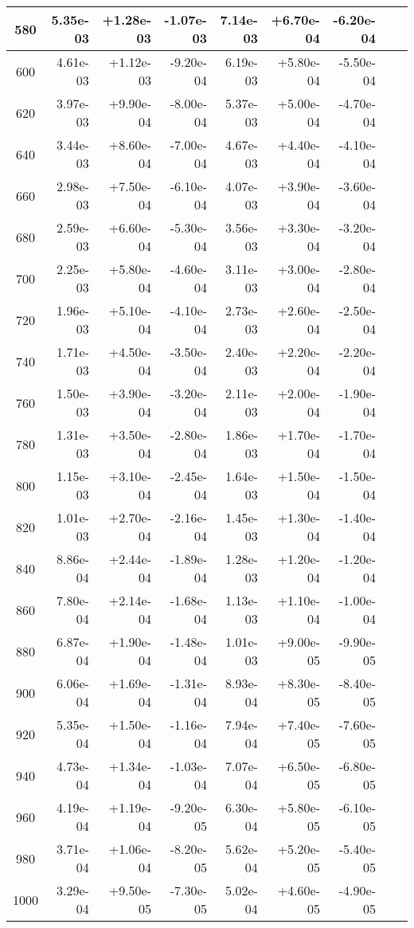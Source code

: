 \begin{tabular}{|c|r|r|r|r|r|r|r|r|}
\hline 580 & 5.35e-03 & +1.28e-03 & -1.07e-03 & 7.14e-03 & +6.70e-04 & -6.20e-04 \\
\hline 600 & 4.61e-03 & +1.12e-03 & -9.20e-04 & 6.19e-03 & +5.80e-04 & -5.50e-04 \\
\hline 620 & 3.97e-03 & +9.90e-04 & -8.00e-04 & 5.37e-03 & +5.00e-04 & -4.70e-04 \\
\hline 640 & 3.44e-03 & +8.60e-04 & -7.00e-04 & 4.67e-03 & +4.40e-04 & -4.10e-04 \\
\hline 660 & 2.98e-03 & +7.50e-04 & -6.10e-04 & 4.07e-03 & +3.90e-04 & -3.60e-04 \\
\hline 680 & 2.59e-03 & +6.60e-04 & -5.30e-04 & 3.56e-03 & +3.30e-04 & -3.20e-04 \\
\hline 700 & 2.25e-03 & +5.80e-04 & -4.60e-04 & 3.11e-03 & +3.00e-04 & -2.80e-04 \\
\hline 720 & 1.96e-03 & +5.10e-04 & -4.10e-04 & 2.73e-03 & +2.60e-04 & -2.50e-04 \\
\hline 740 & 1.71e-03 & +4.50e-04 & -3.50e-04 & 2.40e-03 & +2.20e-04 & -2.20e-04 \\
\hline 760 & 1.50e-03 & +3.90e-04 & -3.20e-04 & 2.11e-03 & +2.00e-04 & -1.90e-04 \\
\hline 780 & 1.31e-03 & +3.50e-04 & -2.80e-04 & 1.86e-03 & +1.70e-04 & -1.70e-04 \\
\hline 800 & 1.15e-03 & +3.10e-04 & -2.45e-04 & 1.64e-03 & +1.50e-04 & -1.50e-04 \\
\hline 820 & 1.01e-03 & +2.70e-04 & -2.16e-04 & 1.45e-03 & +1.30e-04 & -1.40e-04 \\
\hline 840 & 8.86e-04 & +2.44e-04 & -1.89e-04 & 1.28e-03 & +1.20e-04 & -1.20e-04 \\
\hline 860 & 7.80e-04 & +2.14e-04 & -1.68e-04 & 1.13e-03 & +1.10e-04 & -1.00e-04 \\
\hline 880 & 6.87e-04 & +1.90e-04 & -1.48e-04 & 1.01e-03 & +9.00e-05 & -9.90e-05 \\
\hline 900 & 6.06e-04 & +1.69e-04 & -1.31e-04 & 8.93e-04 & +8.30e-05 & -8.40e-05 \\
\hline 920 & 5.35e-04 & +1.50e-04 & -1.16e-04 & 7.94e-04 & +7.40e-05 & -7.60e-05 \\
\hline 940 & 4.73e-04 & +1.34e-04 & -1.03e-04 & 7.07e-04 & +6.50e-05 & -6.80e-05 \\
\hline 960 & 4.19e-04 & +1.19e-04 & -9.20e-05 & 6.30e-04 & +5.80e-05 & -6.10e-05 \\
\hline 980 & 3.71e-04 & +1.06e-04 & -8.20e-05 & 5.62e-04 & +5.20e-05 & -5.40e-05 \\
\hline 1000 & 3.29e-04 & +9.50e-05 & -7.30e-05 & 5.02e-04 & +4.60e-05 & -4.90e-05 \\
\hline\end{tabular}
